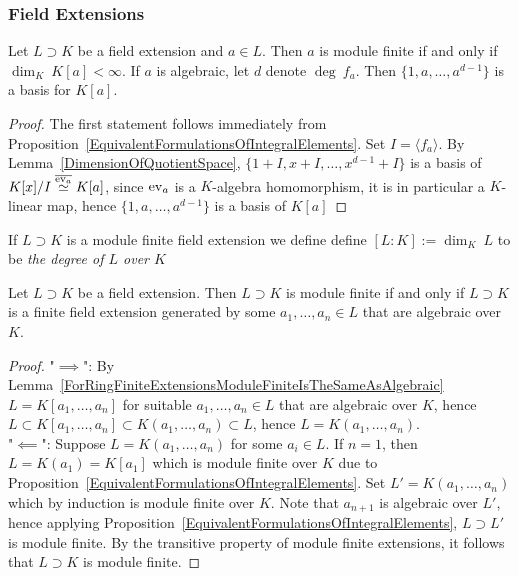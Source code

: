\subsubsection{Field Extensions}
    \begin{lemma}
        Let $L\supset K$ be a field extension and $a\in L$. Then $a$ is module finite if and only if $\dim_K \ K[a] <\infty$. If $a$ is algebraic, let $d$ denote $\deg \ f_a$. Then $\{1,a,\dots,a^{d-1}\}$ is a basis for $K[a]$. 
    \end{lemma}
    \begin{proof}
        The first statement follows immediately from Proposition~\ref{EquivalentFormulationsOfIntegralElements}. Set $I=\langle f_a\rangle$. By Lemma~\ref{DimensionOfQuotientSpace}, $\{1+ I,x+I,\dots,x^{d-1}+I\}$ is a basis of $K[x]/I \overset{\overline{\mathrm{ev}_a}}{\simeq} K[a]$, since $\mathrm{ev}_a$ is a $K$-algebra homomorphism, it is in particular a $K$-linear map, hence $\{1,a,\dots,a^{d-1}\}$ is a basis of $K[a]$
    \end{proof}
    \begin{definition}
        If $L\supset K$ is a module finite field extension we define define $[L:K]:= \dim_K\ L$ to be \textit{the degree of $L$ over $K$} 
    \end{definition}
    \begin{lemma}\label{ModuleFiniteFieldExtensions}
        Let $L\supset K$ be a field extension. Then $L\supset K$ is module finite if and only if $L\supset K$ is a finite field extension generated by some $a_1,\dots,a_n\in L$ that are algebraic over $K$. 
    \end{lemma}
    \begin{proof}
        "$\implies$": By Lemma~\ref{ForRingFiniteExtensionsModuleFiniteIsTheSameAsAlgebraic} $L = K[a_1,\dots,a_n]$ for suitable $a_1,\dots,a_n\in L$ that are algebraic over $K$, hence $L\subset K[a_1,\dots,a_n]\subset K(a_1,\dots,a_n) \subset L$, hence $L=K(a_1,\dots,a_n)$.\\
        "$\impliedby$": Suppose $L=K(a_1,\dots,a_n)$ for some $a_i\in L$. If $n=1$, then $L=K(a_1)=K[a_1]$ which is module finite over $K$ due to Proposition~\ref{EquivalentFormulationsOfIntegralElements}. Set $L'=K(a_1,\dots,a_n)$ which by induction is module finite over $K$. Note that $a_{n+1}$ is algebraic over $L'$, hence applying Proposition~\ref{EquivalentFormulationsOfIntegralElements}, $L\supset L'$ is module finite. By the transitive property of module finite extensions, it follows that $L\supset K$ is module finite.  
    \end{proof}
